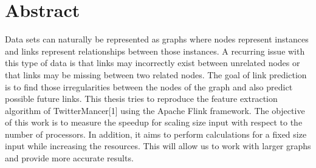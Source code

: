 \chapter*{\Large \center Abstract}

Data sets can naturally be represented as graphs where nodes represent instances and links represent relationships between those instances. A recurring issue with this type of data is that links may incorrectly exist between unrelated nodes or that links may be missing between two related nodes. The goal of link prediction is to find those irregularities between the nodes of the graph and also predict possible future links. \newline 
This thesis tries to reproduce the feature extraction algorithm of TwitterMancer[1] using the Apache Flink framework. The objective of this work is to measure the speedup for scaling size input with respect to the number of processors. In addition, it aims to perform calculations for a fixed size input while increasing the resources. This will allow us to work with larger graphs and provide more accurate results.
